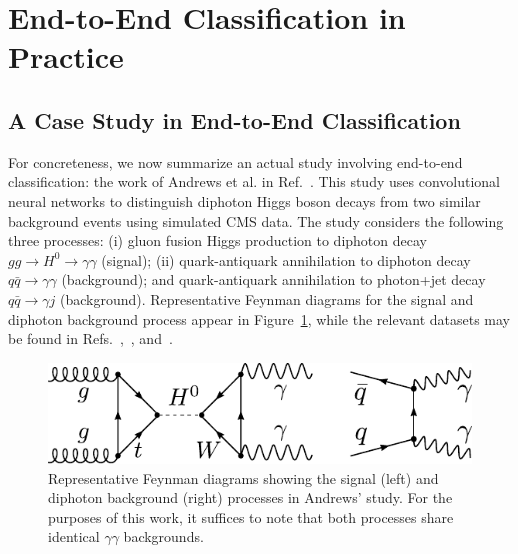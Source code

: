 \documentclass[11pt, a4paper]{article}
\newcommand{\myhref}[2]{\hyperref[#1]{\textcolor{blue}{#2}}}
\begin{document}



\section{End-to-End Classification in Practice}
\subsection{A Case Study in End-to-End Classification}
For concreteness, we now summarize an actual study involving end-to-end classification: the work of Andrews et al. in Ref.~\cite{andrews-higgs}.
This study uses convolutional neural networks to distinguish diphoton Higgs boson decays from two similar background events using simulated CMS data.
The study considers the following three processes: (i) gluon fusion Higgs production to diphoton decay  $ gg \to H^{0} \to \gamma \gamma $ (signal); (ii) quark-antiquark annihilation to diphoton decay $ q \bar{q} \to \gamma \gamma $ (background); and quark-antiquark annihilation to photon+jet decay $ q \bar{q} \to \gamma j $ (background).
Representative Feynman diagrams for the signal and diphoton background process appear in Figure~\ref{fig:feynman-signal-bg}, while the relevant datasets may be found in Refs.~\cite{data-bg-diphoton},~\cite{data-bg-jet}, and~\cite{data-signal}.



\begin{figure}[htb!]
    \centering
    \includegraphics[width=0.8\linewidth]{vector/feynman-signal-bg.pdf}
    \caption{Representative Feynman diagrams showing the signal (left) and diphoton background (right) processes in Andrews' study.
    For the purposes of this work, it suffices to note that both processes share identical $ \gamma \gamma $ backgrounds.}
    \label{fig:feynman-signal-bg}
\end{figure}
\end{document}
